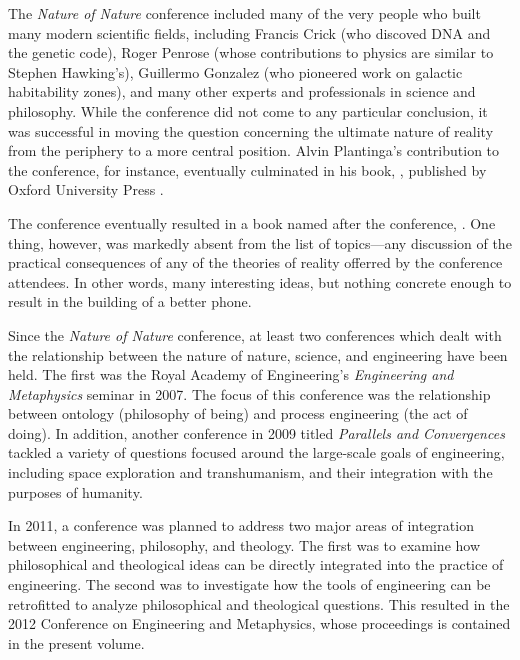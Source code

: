 The \textit{Nature of Nature} conference included many of the very people who built many modern scientific fields, including Francis Crick (who discoved DNA and the genetic code), Roger Penrose (whose contributions to physics are similar to Stephen Hawking's), Guillermo Gonzalez (who pioneered work on galactic habitability zones), and many other experts and professionals in science and philosophy.  While the conference did not come to any particular conclusion, it was successful in moving the question concerning the ultimate nature of reality from the periphery to a more central position.  Alvin Plantinga's contribution to the conference, for instance, eventually culminated in his book, , published by Oxford University Press \citep{plantinga2011, plantinga2011b}.

The conference eventually resulted in a book named after the conference,  \citep{natnat2011}.  One thing, however, was markedly absent from the list of topics---any discussion of the practical consequences of any of the theories of reality offerred by the conference attendees.  In other words, many interesting ideas, but nothing concrete enough to result in the building of a better phone.

Since the \textit{Nature of Nature} conference, at least two conferences which dealt with the relationship between the nature of nature, science, and engineering have been held.
The first was the Royal Academy of Engineering's \textit{Engineering and Metaphysics} seminar in 2007.  The focus of this conference was the relationship between ontology (philosophy of being) and process engineering (the act of doing).  In addition, another conference in 2009 titled \textit{Parallels and Convergences} tackled a variety of questions focused around the large-scale goals of engineering, including space exploration and transhumanism, and their integration with the purposes of humanity.  

In 2011, a conference was planned to address two major areas of integration between engineering, philosophy, and theology.  The first was to examine how philosophical and theological ideas can be directly integrated into the practice of engineering.  The second was to investigate how the tools of engineering can be retrofitted to analyze philosophical and theological questions.  This resulted in the 2012 Conference on Engineering and Metaphysics, whose proceedings is contained in the present volume.


